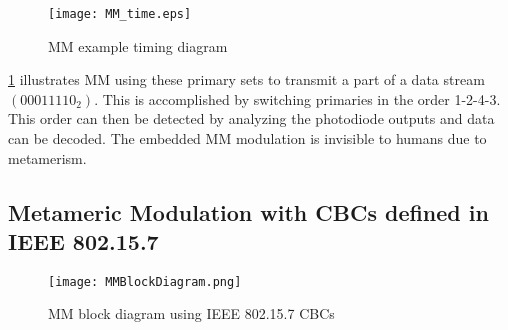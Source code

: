 \begin{figure}[t]
	\centering
    \texttt{[image: MM\_time.eps]}
	\caption{MM example timing diagram}
	\label{figMMex}
\end{figure}

\figurename{ \ref{figMMex}} illustrates MM using these primary sets to transmit a part of a data stream $(00011110_{2})$. This is accomplished by switching primaries in the order 1-2-4-3. This order can then be detected by analyzing the photodiode outputs and data can be decoded. The embedded MM modulation is invisible to humans due to metamerism.

\subsection{Metameric Modulation with CBCs defined in IEEE 802.15.7}
\label{subsec:metamericPerformance}

\begin{figure}[t]
	\centering
    \texttt{[image: MMBlockDiagram.png]}
	\caption{MM block diagram using IEEE 802.15.7 CBCs}
	\label{figMMBD}
\end{figure}


